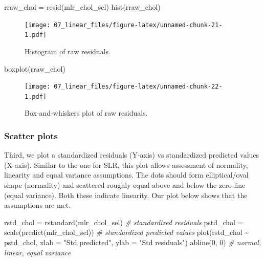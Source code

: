 \documentclass[
  10pt,
]{krantz}
\newenvironment{Shaded}{\begin{snugshade}}{\end{snugshade}}
\newcommand{\AttributeTok}[1]{\textcolor[rgb]{0.77,0.63,0.00}{#1}}
\newcommand{\CommentTok}[1]{\textcolor[rgb]{0.56,0.35,0.01}{\textit{#1}}}
\newcommand{\DecValTok}[1]{\textcolor[rgb]{0.00,0.00,0.81}{#1}}
\newcommand{\FunctionTok}[1]{\textcolor[rgb]{0.00,0.00,0.00}{#1}}
\newcommand{\NormalTok}[1]{#1}
\newcommand{\OtherTok}[1]{\textcolor[rgb]{0.56,0.35,0.01}{#1}}
\newcommand{\SpecialCharTok}[1]{\textcolor[rgb]{0.00,0.00,0.00}{#1}}
\newcommand{\StringTok}[1]{\textcolor[rgb]{0.31,0.60,0.02}{#1}}
\begin{document}
\begin{Shaded}
\begin{Highlighting}[]
\NormalTok{rraw\_chol }\OtherTok{=} \FunctionTok{resid}\NormalTok{(mlr\_chol\_sel)}
\FunctionTok{hist}\NormalTok{(rraw\_chol)}
\end{Highlighting}
\end{Shaded}

\begin{figure}
\centering
\texttt{[image: 07\_linear\_files/figure-latex/unnamed-chunk-21-1.pdf]}
\caption{\label{fig:unnamed-chunk-21}Histogram of raw residuals.}
\end{figure}

\begin{Shaded}
\begin{Highlighting}[]
\FunctionTok{boxplot}\NormalTok{(rraw\_chol)}
\end{Highlighting}
\end{Shaded}

\begin{figure}
\centering
\texttt{[image: 07\_linear\_files/figure-latex/unnamed-chunk-22-1.pdf]}
\caption{\label{fig:unnamed-chunk-22}Box-and-whiskers plot of raw residuals.}
\end{figure}

\hypertarget{scatter-plots}{%
\subsubsection*{Scatter plots}\label{scatter-plots}}


Third, we plot a standardized residuals (Y-axis) vs standardized predicted values (X-axis). Similar to the one for SLR, this plot allows assessment of normality, linearity and equal variance assumptions. The dots should form elliptical/oval shape (normality) and scattered roughly equal above and below the zero line (equal variance). Both these indicate linearity. Our plot below shows that the assumptions are met.

\begin{Shaded}
\begin{Highlighting}[]
\NormalTok{rstd\_chol }\OtherTok{=} \FunctionTok{rstandard}\NormalTok{(mlr\_chol\_sel)  }\CommentTok{\# standardized residuals}
\NormalTok{pstd\_chol }\OtherTok{=} \FunctionTok{scale}\NormalTok{(}\FunctionTok{predict}\NormalTok{(mlr\_chol\_sel))  }\CommentTok{\# standardized predicted values}
\FunctionTok{plot}\NormalTok{(rstd\_chol }\SpecialCharTok{\textasciitilde{}}\NormalTok{ pstd\_chol, }\AttributeTok{xlab =} \StringTok{"Std predicted"}\NormalTok{, }\AttributeTok{ylab =} \StringTok{"Std residuals"}\NormalTok{)}
\FunctionTok{abline}\NormalTok{(}\DecValTok{0}\NormalTok{, }\DecValTok{0}\NormalTok{)  }\CommentTok{\# normal, linear, equal variance}
\end{Highlighting}
\end{Shaded}
\end{document}
